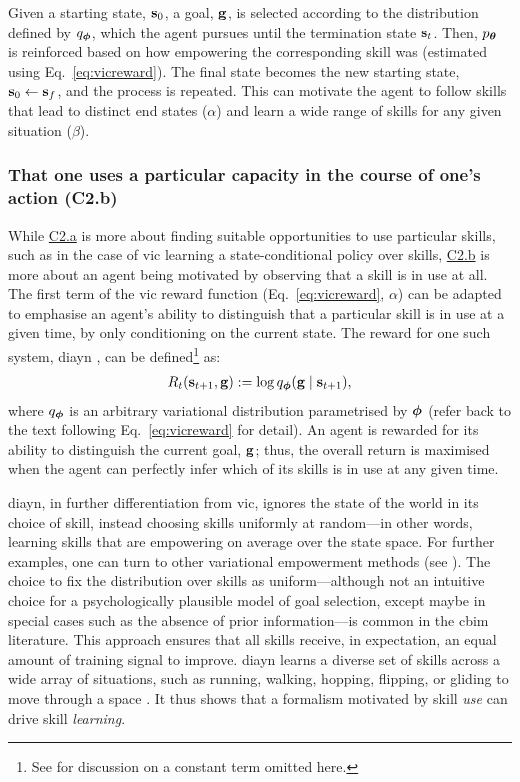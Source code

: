 \documentclass[10pt,letterpaper]{article}
\begin{document}
Given a starting state, ${\mathbf{s}}_0$, a goal, ${\mathbf{g}}$, is selected according to the distribution defined by $q_{\boldsymbol{\phi}}$, which the agent pursues until the termination state ${\mathbf{s}}_t$. Then, $p_{\boldsymbol{\theta}}$ is reinforced based on how empowering the corresponding skill was (estimated using Eq.~\ref{eq:vicreward}). The final state becomes the new starting state, ${\mathbf{s}}_0 \leftarrow {\mathbf{s}}_f$, and the process is repeated. This can motivate the agent to follow skills that lead to distinct end states ($\alpha$) and learn a wide range of skills for any given situation ($\beta$).


\subsubsection{That one uses a particular capacity in the course of one's action (C2.b)}
 \label{sec:c2b}

While \hyperref[sec:c2a]{C2.a} is more about finding suitable opportunities to use particular skills, such as in the case of \gls{vic} learning a state-conditional policy over skills, \hyperref[sec:c2b]{C2.b} is more about an agent being motivated by observing that a skill is in use at all. The first term of the \gls{vic} reward function (Eq.~\ref{eq:vicreward}, $\alpha$) can be adapted to emphasise an agent's ability to distinguish that a particular skill is in use at a given time, by only conditioning on the current state. The reward for one such system, \gls{diayn} \citep{eysenbach2019diversity}, can be defined\footnote{See \citealp[Appendix~A, p.~12]{eysenbach2019diversity} for discussion on a constant term omitted here.} as:
\begin{align}\label{eq:diayn}
R_t({\mathbf{s}}_{t+1}, {\mathbf{g}}) := \log q_{\boldsymbol{\phi}}({\mathbf{g}} \mid {\mathbf{s}}_{t+1}),
\end{align}
where $q_{\boldsymbol{\phi}}$ is an arbitrary variational distribution parametrised by ${\boldsymbol{\phi}}$ (refer back to the text following Eq.~\ref{eq:vicreward} for detail). An agent is rewarded for its ability to distinguish the current goal, ${\mathbf{g}}$; thus, the overall return is maximised when the agent can perfectly infer which of its skills is in use at any given time.

\Gls{diayn}, in further differentiation from \gls{vic}, ignores the state of the world in its choice of skill, instead choosing skills uniformly at random---in other words, learning skills that are empowering on average over the state space. For further examples, one can turn to other variational empowerment methods (see \citealp[p.~3]{choi2021variational}). The choice to fix the distribution over skills as uniform---although not an intuitive choice for a psychologically plausible model of goal selection, except maybe in special cases such as the absence of prior information---is common in the \gls{cbim} literature. This approach ensures that all skills receive, in expectation, an equal amount of training signal to improve. \Gls{diayn} learns a diverse set of skills across a wide array of situations, such as running, walking, hopping, flipping, or gliding to move through a space \citep[p.~5]{eysenbach2019diversity}. It thus shows that a formalism motivated by skill \emph{use} can drive skill \emph{learning}.
\end{document}
